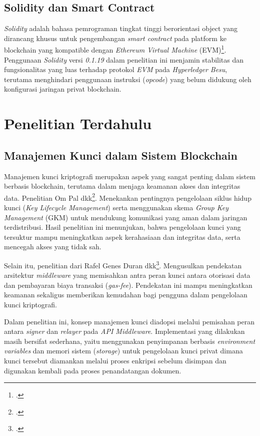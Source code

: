 		\subsection{Solidity dan Smart Contract}
		\textit{Solidity} adalah bahasa pemrograman tingkat tinggi berorientasi object yang dirancang khusus untuk pengembangan \textit{smart contract} pada platform ke blockchain yang kompatible dengan \textit{Ethereum Virtual Machine}  (EVM)\footcite{Wood2014}. Penggunaan \textit{Solidity} versi \textit{0.1.19} dalam penelitian ini menjamin stabilitas dan fungsionalitas yang luas terhadap protokol \textit{EVM} pada \textit{Hyperledger Besu}, terutama menghindari penggunaan instruksi (\textit{opcode}) yang belum didukung oleh konfigurasi jaringan privat blockchain.



		
	\section{Penelitian Terdahulu}
		\subsection{Manajemen Kunci dalam Sistem Blockchain}
		Manajemen kunci kriptografi merupakan aspek yang sangat penting dalam sistem berbasis blockchain, terutama dalam menjaga keamanan akses dan integritas data. Penelitian Om Pal dkk\footcite{Pal2021}. Menekankan pentingnya pengelolaan siklus hidup kunci (\textit{Key Lifecycle Management}) serta menggunakan skema \textit{Group Key Management} (GKM) untuk mendukung komunikasi yang aman dalam jaringan terdistribusi. Hasil penelitian ini menunjukan, bahwa pengelolaan kunci yang tersuktur mampu meningkatkan aspek kerahasiaan dan integritas data, serta mencegah akses yang tidak sah.

		Selain itu, penelitian dari Rafel Genes Duran dkk\footcite{Duran2020}. Mengusulkan pendekatan arsitektur \textit{middleware} yang memisahkan antra peran kunci antara otorisasi data dan pembayaran biaya transaksi (\textit{gas-fee}). Pendekatan ini mampu meningkatkan keamanan sekaligus memberikan kemudahan bagi pengguna dalam pengelolaan kunci kriptografi.

		Dalam penelitian ini, konsep manajemen kunci diadopsi melalui pemisahan peran antara \textit{signer} dan \textit{relayer} pada \textit{API Middleware}. Implementasi yang dilakukan masih bersifat sederhana, yaitu menggunakan penyimpanan berbasis \textit{environment variables} dan memori sistem (\textit{storage}) untuk pengelolaan kunci privat dimana kunci tersebut diamankan melalui proses enkripsi sebelum disimpan dan digunakan kembali pada proses penandatangan dokumen.

